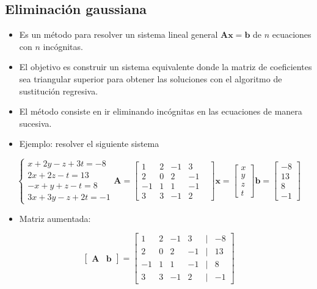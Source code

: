 \documentclass[openany]{book}
\providecommand{\tightlist}{%
  \setlength{\itemsep}{0pt}\setlength{\parskip}{0pt}}
\begin{document}
\hypertarget{eliminaciuxf3n-gaussiana}{%
\subsection{Eliminación gaussiana}\label{eliminaciuxf3n-gaussiana}}

\begin{itemize}
\tightlist
\item
  Es un método para resolver un sistema lineal general \(\mathbf{Ax=b}\) de \(n\) ecuaciones con \(n\) incógnitas.
\item
  El objetivo es construir un sistema equivalente donde la matriz de coeficientes sea triangular superior para obtener las soluciones con el algoritmo de sustitución regresiva.
\item
  El método consiste en ir eliminando incógnitas en las ecuaciones de manera sucesiva.
\item
  Ejemplo: resolver el siguiente sistema
\end{itemize}

\[
\begin{cases} 
x+2y-z+3t=-8 \\
2x+2z-t=13 \\
-x+y+z-t=8\\
3x+3y-z+2t = -1
\end{cases}
\mathbf{A}=
\begin{bmatrix}
1 & 2 & -1 & 3 \\
2 & 0 & 2 & -1 \\
-1 & 1 & 1 & -1 \\
3 & 3 & -1 & 2 &  
\end{bmatrix}
\mathbf{x} = 
\begin{bmatrix}
x \\ y \\ z \\ t
\end{bmatrix}
\mathbf{b} =
\begin{bmatrix}
-8 \\ 13 \\ 8 \\ -1
\end{bmatrix}
\]

\begin{itemize}
\tightlist
\item
  Matriz aumentada:
\end{itemize}

\[
\begin{bmatrix}
    \mathbf{A} & \mathbf{b}
\end{bmatrix}
=
\begin{bmatrix}
    1 & 2 & -1 & 3 &|& -8\\
    2 & 0 & 2 & -1 &|& 13\\
    -1 & 1 & 1 & -1 &|& 8\\
    3 & 3 & -1 & 2 &|& -1  
\end{bmatrix}
\]
\end{document}
